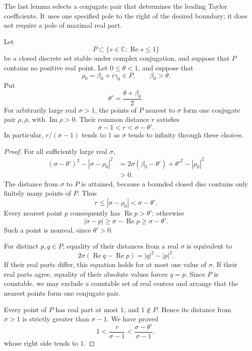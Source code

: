 The last lemma selects a conjugate pair that determines the leading Taylor coefficients. It uses one specified pole to the right of the desired boundary; it does not require a pole of maximal real part.

\begin{lemma}\label{thm:nearest-poles}
Let
\[
P\subset\{s\in\mathbb C:\operatorname{Re}s\leq 1\}
\]
be a closed discrete set stable under complex conjugation, and suppose that $P$ contains no positive real point. Let $0\leq\theta<1$, and suppose that
\[
\rho_0=\beta_0+i\gamma_0\in P,
\qquad \beta_0>\theta.
\]
Put
\[
\theta'=\frac{\theta+\beta_0}{2}.
\]
For arbitrarily large real $\sigma>1$, the points of $P$ nearest to $\sigma$ form one conjugate pair $\rho,\overline{\rho}$, with $\operatorname{Im}\rho>0$. Their common distance $r$ satisfies
\[
\sigma-1<r<\sigma-\theta'.
\]
In particular, $r/(\sigma-1)$ tends to $1$ as $\sigma$ tends to infinity through these choices.
\end{lemma}

\begin{proof}
For all sufficiently large real $\sigma$,
\[
\begin{aligned}
(\sigma-\theta')^2-|\sigma-\rho_0|^2
&=
2\sigma(\beta_0-\theta')
+\theta'^2-|\rho_0|^2\\
&>0.
\end{aligned}
\]
The distance from $\sigma$ to $P$ is attained, because a bounded closed disc contains only finitely many points of $P$. Thus
\[
r\leq|\sigma-\rho_0|<\sigma-\theta'.
\]
Every nearest point $p$ consequently has $\operatorname{Re}p>\theta'$: otherwise
\[
|\sigma-p|
\geq \sigma-\operatorname{Re}p
\geq \sigma-\theta'.
\]
Such a point is nonreal, since $\theta'>0$.

For distinct $p,q\in P$, equality of their distances from a real $\sigma$ is equivalent to
\[
2\sigma(\operatorname{Re}q-\operatorname{Re}p)
=
|q|^2-|p|^2.
\]
If their real parts differ, this equation holds for at most one value of $\sigma$. If their real parts agree, equality of their absolute values forces $q=\overline p$. Since $P$ is countable, we may exclude a countable set of real centers and arrange that the nearest points form one conjugate pair.

Every point of $P$ has real part at most $1$, and $1\notin P$. Hence its distance from $\sigma>1$ is strictly greater than $\sigma-1$. We have proved
\[
1<
\frac{r}{\sigma-1}
<
\frac{\sigma-\theta'}{\sigma-1},
\]
whose right side tends to $1$.
\end{proof}

